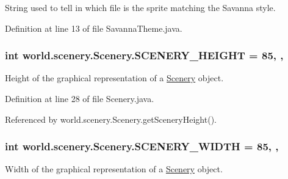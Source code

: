 String used to tell in which file is the sprite matching the Savanna style. 



Definition at line 13 of file Savanna\-Theme.\-java.

\hypertarget{a00024_a106e53ae6e1647395740237ccce7f363}{
\subsubsection[{S\-C\-E\-N\-E\-R\-Y\-\_\-\-H\-E\-I\-G\-H\-T}]{\setlength{\rightskip}{0pt plus 5cm}int world.\-scenery.\-Scenery.\-S\-C\-E\-N\-E\-R\-Y\-\_\-\-H\-E\-I\-G\-H\-T = 85\hspace{0.3cm}{\ttfamily [static]}, {\ttfamily [protected]}, {\ttfamily [inherited]}}}\label{a00024_a106e53ae6e1647395740237ccce7f363}


Height of the graphical representation of a \hyperlink{a00024}{Scenery} object. 



Definition at line 28 of file Scenery.\-java.



Referenced by world.\-scenery.\-Scenery.\-get\-Scenery\-Height().

\hypertarget{a00024_affb047c028883c6d069a03ef0f1caeb8}{
\subsubsection[{S\-C\-E\-N\-E\-R\-Y\-\_\-\-W\-I\-D\-T\-H}]{\setlength{\rightskip}{0pt plus 5cm}int world.\-scenery.\-Scenery.\-S\-C\-E\-N\-E\-R\-Y\-\_\-\-W\-I\-D\-T\-H = 85\hspace{0.3cm}{\ttfamily [static]}, {\ttfamily [protected]}, {\ttfamily [inherited]}}}\label{a00024_affb047c028883c6d069a03ef0f1caeb8}


Width of the graphical representation of a \hyperlink{a00024}{Scenery} object. 




